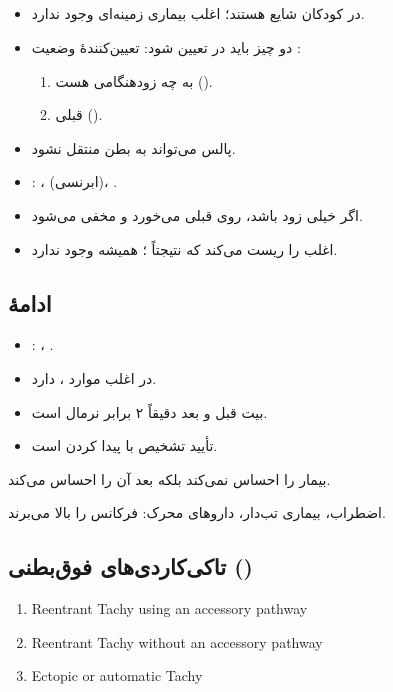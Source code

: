 \documentclass[12pt,a4paper]{article}
\begin{document}
\subsection*{}
\begin{itemize}
\item در کودکان شایع هستند؛ اغلب بیماری زمینه‌ای وجود ندارد.
\item دو چیز باید در  تعیین شود: تعیین‌کنندهٔ وضعیت :
\begin{enumerate}
\item به چه زودهنگامی هست ().
\item {} قبلی ().
\end{enumerate}
\item پالس می‌تواند به بطن منتقل نشود.
\item {}: ،  (ابرنسی)، .
\item اگر  خیلی زود باشد، روی  قبلی می‌خورد و مخفی می‌شود.
\item {} اغلب  را ریست می‌کند که نتیجتاً ؛ همیشه وجود ندارد.
\end{itemize}
\subsection*{ادامهٔ }
\begin{itemize}
\item {}: ، .
\item در اغلب موارد ،  دارد.
\item {} بیت قبل و بعد دقیقاً ۲ برابر  نرمال است.
\item تأیید تشخیص  با پیدا کردن  است.
\end{itemize}

بیمار  را احساس نمی‌کند بلکه  بعد آن را احساس می‌کند.

اضطراب، بیماری تب‌دار، داروهای محرک: فرکانس  را بالا می‌برند.
\subsection*{تاکی‌کاردی‌های فوق‌بطنی ()}
\begin{latin}
\begin{enumerate}
\item Reentrant Tachy using an accessory pathway
\item Reentrant Tachy without an accessory pathway
\item Ectopic or automatic Tachy
\end{enumerate}
\end{latin}
\end{document}
